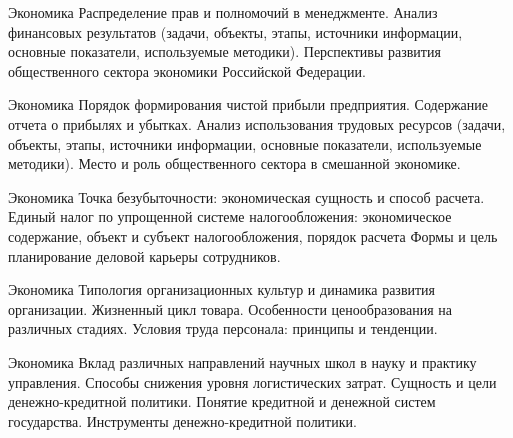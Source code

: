 \documentclass[
	11pt,
	a4paper,
	]
	{article}
\begin{document}
\begin{minipage}[t][\miniH]{\miniL}\centering
	 {Экономика}
		{
			Распределение прав и полномочий в менеджменте.
		}{
			Анализ финансовых результатов (задачи, объекты, этапы, источники информации, основные показатели, используемые методики).
		}{
			Перспективы развития общественного сектора экономики Российской Федерации.
		}
	\lowGE
\end{minipage}

\vfill



\begin{minipage}[t][\miniH]{\miniL}\centering
	 {Экономика}
		{
			Порядок формирования чистой прибыли предприятия. Содержание отчета о прибылях и убытках.
		}{
			Анализ использования трудовых ресурсов (задачи, объекты, этапы, источники информации, основные показатели, используемые методики).
		}{
			Место и роль общественного сектора в смешанной экономике.
		}
	\lowGE
\end{minipage}

\vfill



\begin{minipage}[t][\miniH]{\miniL}\centering
	 {Экономика}
		{
			Точка безубыточности: экономическая сущность и способ расчета.
		}{
			Единый налог по упрощенной системе налогообложения: экономическое содержание, объект и субъект налогообложения, порядок расчета
		}{
			Формы и цель планирование деловой карьеры сотрудников.
		}
	\lowGE
\end{minipage}





\begin{minipage}[t][\miniH]{\miniL}\centering
	 {Экономика}
		{
			Типология организационных культур и динамика развития организации.
		}{
			Жизненный цикл товара. Особенности ценообразования на различных стадиях.
		}{
			Условия труда персонала: принципы и тенденции.
		}
	\lowGE
\end{minipage}

\vfill



\begin{minipage}[t][\miniH]{\miniL}\centering
	 {Экономика}
		{
			Вклад различных направлений научных школ в науку и практику управления.
		}{
			Способы снижения уровня логистических затрат.
		}{
			Сущность и цели денежно-кредитной политики. Понятие кредитной и денежной систем государства. Инструменты денежно-кредитной политики.
		}
	\lowGE
\end{minipage}
\end{document}
